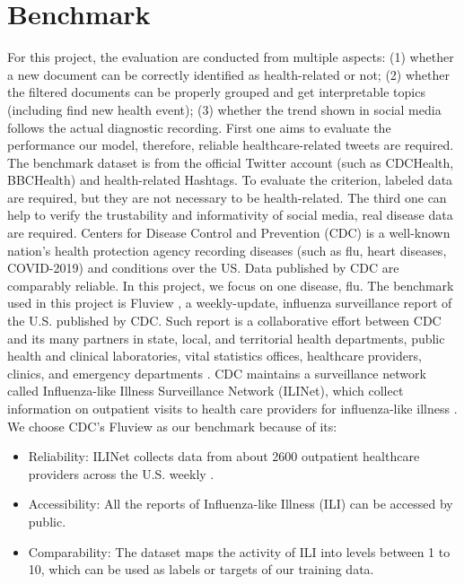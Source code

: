 \section{Benchmark}
For this project, the evaluation are conducted from multiple aspects: (1) whether a new document can be correctly identified as health-related or not; (2) whether the filtered documents can be properly grouped and get interpretable topics (including find new health event); (3) whether the trend shown in social media follows the actual diagnostic recording. First one aims to evaluate the performance our model, therefore, reliable healthcare-related tweets are required. The benchmark dataset is from the official Twitter account (such as CDCHealth, BBCHealth) and health-related Hashtags. To evaluate the criterion, labeled data are required, but they are not necessary to be health-related. The third one can help to verify the trustability and informativity of social media, real disease data are required. Centers for Disease Control and Prevention (CDC)\cite{cdc.gov} is a well-known nation's health protection agency recording diseases (such as flu, heart diseases, COVID-2019) and conditions over the US. Data published by CDC are comparably reliable. In this project, we focus on one disease, flu. The benchmark used in this project is Fluview \cite{cdc:fluView}, a weekly-update, influenza surveillance report of the U.S. published by CDC. Such report is a collaborative effort between CDC and its many partners in state, local, and territorial health departments, public health and clinical laboratories, vital statistics offices, healthcare providers, clinics, and emergency departments \cite{cdc.gov}. CDC maintains a surveillance network called Influenza-like Illness Surveillance Network (ILINet), which collect information on outpatient visits to health care providers for influenza-like illness \cite{cdc.gov}. We choose CDC's Fluview as our benchmark because of its:
\begin{itemize}
    \item Reliability: ILINet collects data from about 2600 outpatient healthcare providers across the U.S. weekly \cite{cdc.gov}.
    \item Accessibility: All the reports of Influenza-like Illness (ILI) can be accessed by public.
    \item Comparability: The dataset maps the activity of ILI into levels between 1 to 10, which can be used as labels or targets of our training data.
\end{itemize}
